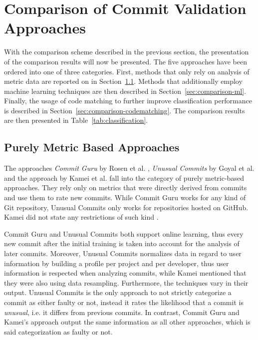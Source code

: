 \section{Comparison of Commit Validation Approaches}
\label{sec:comparison}

With the comparison scheme described in the previous section,
the presentation of the comparison results will now be presented.
The five approaches have been ordered into one of three categories. First, methods that only rely on analysis of metric data are reported on in Section~\ref{sec:comparison-metricbased}. Methods that additionally employ machine learning techniques are then described in Section~\ref{sec:comparison-ml}. Finally, the usage of code matching to further improve classification performance is described in Section~\ref{sec:comparison-codematching}.
The comparison results are then presented in Table~\ref{tab:classification}.

\subsection{Purely Metric Based Approaches}
\label{sec:comparison-metricbased}

The approaches \textit{Commit Guru} by Rosen et al. \cite{Rosen2015}, \textit{Unusual Commits} by Goyal et al. \cite{Goyal2017} and the approach by Kamei et al. \cite{Kamei2013} fall into the category of purely metric-based approaches. They rely only on metrics that were directly derived from commits and use them to rate new commits. While Commit Guru works for any kind of Git repository, Unusual Commits only works for repositories hosted on GitHub. Kamei did not state any restrictions of such kind \cite{Kamei2013}.

Commit Guru and Unusual Commits both support online learning, thus every new commit after the initial training is taken into account for the analysis of later commits.
Moreover, Unusual Commits normalizes data in regard to user information by building a profile per project and per developer, thus user information is respected when analyzing commits, 
while Kamei mentioned that they were also using data resampling.
Furthermore, the techniques vary in their output. Unusual Commits is the only approach to not strictly categorize a commit as either faulty or not, instead it rates the likelihood that a commit is \textit{unusual}, i.e. it differs from previous commits.
In contrast, Commit Guru and Kamei's approach output the same information as all other approaches, which is said categorization as faulty or not.

